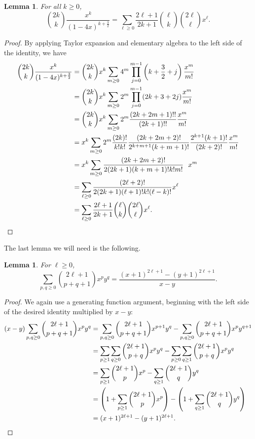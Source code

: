 \documentclass{amsart}
\numberwithin{equation}{section}
\theoremstyle{plain}
\newtheorem{lem}[thm]{Lemma}
\theoremstyle{definition}
\begin{document}
\begin{lem} \label{hodai2}
For all $k \geq 0$,
\[
    \binom{2k}{k}\frac{x^k}{(1-4x)^{k+\frac{3}{2}}} = \sum_{\ell \ge 0} \frac{2\ell+1}{2k+1}\binom{\ell}{k}\binom{2\ell}{\ell}x^\ell.
\]  
\end{lem}

\begin{proof}
By applying Taylor expansion and elementary algebra to the left side of the identity, we have
    \begin{align*}
\binom{2k}{k}
\frac{x^k}{(1-4x)^{k+\frac{3}{2}}}
&=
\binom{2k}{k} x^k
\sum_{m \ge 0}
4^m \prod_{j=0}^{m-1} \left(k + \frac{3}{2} + j\right)
\frac{x^m}{m!}\\
&=
\binom{2k}{k} x^k
\sum_{m \ge 0}
2^m \prod_{j=0}^{m-1} (2k+3 + 2j)
\frac{x^m}{m!}\\
&=
\binom{2k}{k} x^k
\sum_{m \ge 0}
2^m 
\frac{(2k +2m+1)!!}{(2k+1)!!}
\frac{x^m}{m!}\\
&=
x^k
\sum_{m \ge 0}
2^m 
\frac{(2k)!}{k!k!}
\frac{(2k +2m+2)!}{2^{k+m+1}(k +m+1)!}
\frac{2^{k+1} (k+1)!}{(2k+2)!}
\frac{x^m}{m!}\\
&=
x^k
\sum_{m \ge 0}
\frac{(2k +2m+2)!}{2(2k+1) (k +m+1)!k!m!} \ \ 
x^m\\
&=
\sum_{\ell \ge 0}
\frac{(2\ell+2)!}{2(2k +1) (\ell+1)!k!(\ell-k)!}
x^\ell\\
&=
\sum_{\ell \ge 0}
\frac{2\ell+1}{2k+1}
\binom{\ell}{k} \binom{2\ell}{\ell}
x^\ell. \qedhere
\end{align*}
\end{proof}

The last lemma we will need is the following.

\begin{lem} \label{hodai3}
For $\ell \geq 0$,
\[
    \sum_{p,q \ge 0}\binom{2 \ell +1}{p+q+1} x^p y^q = \frac{(x+1)^{2\ell+1} - (y+1)^{2\ell+1}}{x-y}.
\]
\end{lem}

\begin{proof}
We again use a generating function argument, beginning with the left side of the desired identity multiplied by $x-y$:
\begin{align*}
(x-y)    \sum_{p,q \ge 0}
\binom{2 \ell +1}{p+q+1} x^p y^q 
&=
\sum_{p,q \ge 0}
\binom{2 \ell +1}{p+q+1} x^{p+1} y^q
-
\sum_{p,q \ge 0}
\binom{2 \ell +1}{p+q+1} x^p y^{q+1}\\
&= 
\sum_{p \ge 1}
\sum_{q \ge 0}
\binom{2 \ell +1}{p+q} x^{p} y^q
-
\sum_{p \ge 0}
\sum_{q \ge 1}
\binom{2 \ell +1}{p+q} x^p y^{q}\\
&=
\sum_{p \ge 1}
\binom{2 \ell +1}{p} x^{p}
-
\sum_{q \ge 1}
\binom{2 \ell +1}{q} y^{q}\\
&= 
\left(1+\sum_{p \ge 1}
\binom{2 \ell +1}{p} x^{p}\right)
-\left(1+
\sum_{q \ge 1}
\binom{2 \ell +1}{q} y^{q}\right)\\
&=(x+1)^{2\ell+1} - (y+1)^{2\ell+1}. \qedhere
\end{align*}
\end{proof}
\end{document}
